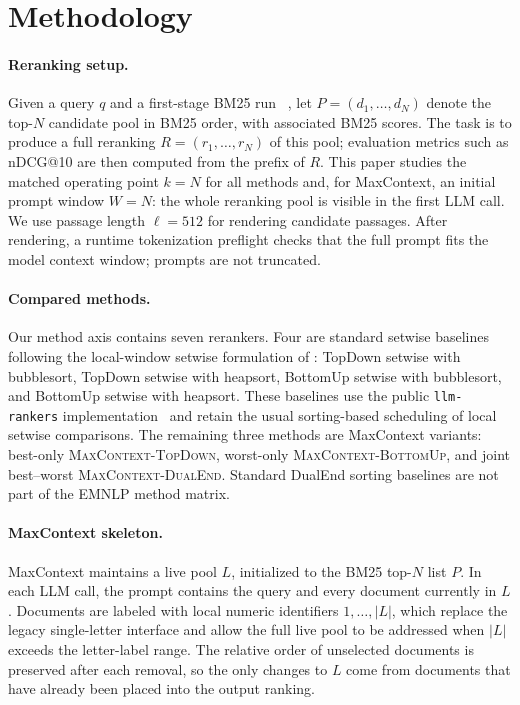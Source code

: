 \section{Methodology}
\label{sec:methodology}

\paragraph{Reranking setup.}
Given a query $q$ and a first-stage BM25 run
~\citep{robertson2009probabilistic}, let
$P=(d_1,\ldots,d_N)$ denote the top-$N$ candidate pool in BM25 order,
with associated BM25 scores. The task is to produce a full reranking
$R=(r_1,\ldots,r_N)$ of this pool; evaluation metrics such as nDCG@10 are
then computed from the prefix of $R$. This paper studies the matched
operating point $k=N$ for all methods and, for MaxContext, an initial
prompt window $W=N$: the whole reranking pool is visible in the first
LLM call. We use passage length $\ell=512$ for rendering candidate
passages. After rendering, a runtime tokenization preflight checks that
the full prompt fits the model context window; prompts are not truncated.

\paragraph{Compared methods.}
Our method axis contains seven rerankers. Four are standard setwise
baselines following the local-window setwise formulation of
\citet{zhuang2024setwise}: TopDown setwise with bubblesort, TopDown
setwise with heapsort, BottomUp setwise with bubblesort, and BottomUp
setwise with heapsort. These baselines use the public
\texttt{llm-rankers} implementation~\citep{ielab_llmrankers} and retain
the usual sorting-based scheduling of local setwise comparisons. The
remaining three methods are MaxContext variants: best-only
\textsc{MaxContext-TopDown}, worst-only \textsc{MaxContext-BottomUp}, and
joint best--worst \textsc{MaxContext-DualEnd}. Standard DualEnd sorting
baselines are not part of the EMNLP method matrix.

\paragraph{MaxContext skeleton.}
MaxContext maintains a live pool $L$, initialized to the BM25 top-$N$
list $P$. In each LLM call, the prompt contains the query and every
document currently in $L$. Documents are labeled with local numeric
identifiers $1,\ldots,|L|$, which replace the legacy single-letter
interface and allow the full live pool to be addressed when
$|L|$ exceeds the letter-label range. The relative order of unselected
documents is preserved after each removal, so the only changes to $L$
come from documents that have already been placed into the output
ranking.


